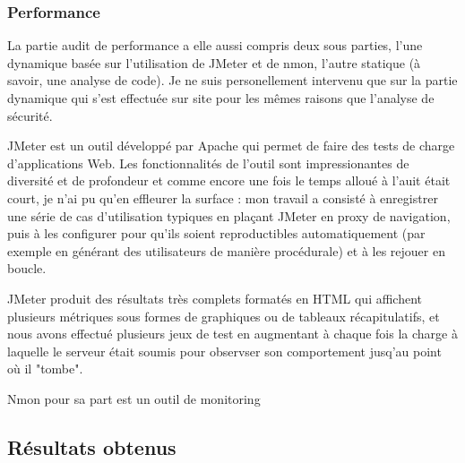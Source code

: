 \subsubsection{Performance}
La partie audit de performance a elle aussi compris deux sous parties, l'une dynamique basée sur l'utilisation de JMeter\cite{jmeter} et de nmon\cite{nmon}, l'autre statique (à savoir, une analyse de code). Je ne suis personellement intervenu que sur la partie dynamique qui s'est effectuée sur site pour les mêmes raisons que l'analyse de sécurité.

JMeter est un outil développé par Apache qui permet de faire des tests de charge d'applications Web. Les fonctionnalités de l'outil sont impressionantes de diversité et de profondeur et comme encore une fois le temps alloué à l'auit était court, je n'ai pu qu'en effleurer la surface : mon travail a consisté à enregistrer une série de cas d'utilisation typiques en plaçant JMeter en proxy de navigation, puis à les configurer pour qu'ils soient reproductibles automatiquement (par exemple en générant des utilisateurs de manière procédurale) et à les rejouer en boucle.

JMeter produit des résultats très complets formatés en HTML qui affichent plusieurs métriques sous formes de graphiques ou de tableaux récapitulatifs, et nous avons effectué plusieurs jeux de test en augmentant à chaque fois la charge à laquelle le serveur était soumis pour observser son comportement jusq'au point où il "tombe".

Nmon pour sa part est un outil de monitoring

\subsubsection{}

\subsection{Résultats obtenus}
